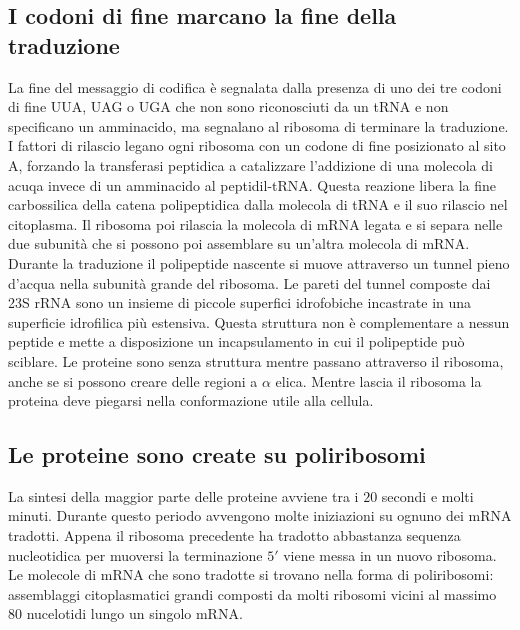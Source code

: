 \subsection{I codoni di fine marcano la fine della traduzione}
La fine del messaggio di codifica \`e segnalata dalla presenza di uno dei tre codoni di fine UUA, UAG o UGA che non sono riconosciuti da un tRNA e non specificano un amminacido, ma 
segnalano al ribosoma di terminare la traduzione. I fattori di rilascio legano ogni ribosoma con un codone di fine posizionato al sito A, forzando la transferasi peptidica a catalizzare
l'addizione di una molecola di acuqa invece di un amminacido al peptidil-tRNA. Questa reazione libera la fine carbossilica della catena polipeptidica dalla molecola di tRNA e il suo
rilascio nel citoplasma. Il ribosoma poi rilascia la molecola di mRNA legata e si separa nelle due subunit\`a che si possono poi assemblare su un'altra molecola di mRNA. Durante la
traduzione il polipeptide nascente si muove attraverso un tunnel pieno d'acqua nella subunit\`a grande del ribosoma. Le pareti del tunnel composte dai 23S rRNA sono un insieme di 
piccole superfici idrofobiche incastrate in una superficie idrofilica pi\`u estensiva. Questa struttura non \`e complementare a nessun peptide  e mette a disposizione un incapsulamento
in cui il polipeptide pu\`o sciblare. Le proteine sono senza struttura mentre passano attraverso il ribosoma, anche se si possono creare delle regioni a $\alpha$ elica. Mentre lascia il
ribosoma la proteina deve piegarsi nella conformazione utile alla cellula. 
\subsection{Le proteine sono create su poliribosomi}
La sintesi della maggior parte delle proteine avviene tra i $20$ secondi e molti minuti. Durante questo periodo avvengono molte iniziazioni su ognuno dei mRNA tradotti. Appena il 
ribosoma precedente ha tradotto abbastanza sequenza nucleotidica per muoversi la terminazione $5'$ viene messa in un nuovo ribosoma. Le molecole di mRNA che sono tradotte si trovano 
nella forma di poliribosomi: assemblaggi citoplasmatici grandi composti da molti ribosomi vicini al massimo $80$ nucelotidi lungo un singolo mRNA. 
